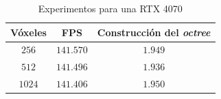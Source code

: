 \begin{table}
\centering
\begin{tabular}{|c|c|c|}
	\hline
	\textbf{Vóxeles} & \textbf{FPS} & \textbf{Construcción del \textit{octree}} \\
	\hline
	$256$ & $141.570$ & $1.949$ \\
	\hline
	$512$ & $141.496$ & $1.936$ \\
	\hline
	$1024$ & $141.406$ & $1.950$ \\
	\hline
\end{tabular}
\caption{Experimentos para una RTX 4070}
\label{tab:pizzo-desktop}
\end{table}
